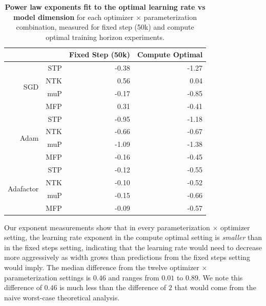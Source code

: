 \documentclass{article}
\theoremstyle{plain}
\theoremstyle{definition}
\theoremstyle{remark}
\begin{document}
\begin{table}[htbp]
  \centering
  \caption{\textbf{Power law exponents fit to the optimal learning rate vs model dimension} for each optimizer $\times$ parameterization combination, measured for fixed step (50k) and compute optimal training horizon experiments.}
  \vspace{2pt}
  \begin{adjustbox}{scale=0.8}
    \begin{tabular}{rrrr}
        \toprule
            &           & \textbf{Fixed Step (50k)}           & \textbf{Compute Optimal}  \\
         \midrule
          \multirow{4}{*}{SGD} & STP        & -0.38         & -1.27  \\
          & NTK                             & 0.56          & 0.04   \\
          & muP                             & -0.17         & -0.85  \\
          & MFP                             & 0.31          & -0.41  \\  \midrule
          \multirow{4}{*}{Adam} & STP       & -0.95         & -1.18  \\
          & NTK                             & -0.66         & -0.67  \\
          & muP                             & -1.09         & -1.38  \\
          & MFP                             & -0.16         & -0.45  \\ \midrule
          \multirow{4}{*}{Adafactor} & STP  & -0.12         & -0.55  \\
          & NTK                             & -0.10         & -0.52  \\
          & muP                             & -0.15         & -0.66  \\
          & MFP                             & -0.09         & -0.57 \\
        \bottomrule
    \end{tabular}
    \end{adjustbox}
  \label{tab:compute_opt_exponents}
\end{table}

Our exponent measurements show that in every parameterization $\times$ optimizer setting, the learning rate exponent in the compute optimal setting is \emph{smaller} than in the fixed steps setting, indicating that the learning rate would need to decrease more aggressively as width grows than predictions from the fixed steps setting would imply. The median difference from the twelve optimizer $\times$ parameterization settings is $0.46$ and ranges from $0.01$ to $0.89$. We note this difference of $0.46$ is much less than the difference of $2$ that would come from the naive worst-case theoretical analysis.
\end{document}
